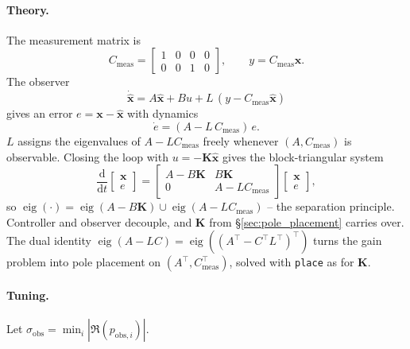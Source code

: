 \documentclass[11pt,a4paper]{article}
\begin{document}
\paragraph{Theory.}
The measurement matrix is
\begin{equation}
	C_{\mathrm{meas}} = \begin{bmatrix} 1 & 0 & 0 & 0 \\ 0 & 0 & 1 & 0 \end{bmatrix}, \qquad y = C_{\mathrm{meas}}\mathbf{x}.
\end{equation}
The observer
\begin{equation}
	\dot{\hat{\mathbf{x}}} = A\hat{\mathbf{x}} + B u + L\,(y - C_{\mathrm{meas}}\hat{\mathbf{x}})
	\label{eq:luenberger}
\end{equation}
gives an error $e = \mathbf{x} - \hat{\mathbf{x}}$ with dynamics
\begin{equation}
	\dot{e} = (A - L\,C_{\mathrm{meas}})\,e.
	\label{eq:err_dyn}
\end{equation}
$L$ assigns the eigenvalues of $A - LC_{\mathrm{meas}}$ freely whenever $(A, C_{\mathrm{meas}})$ is observable. Closing the loop with $u = -\mathbf{K}\hat{\mathbf{x}}$ gives the block-triangular system
\begin{equation}
	\frac{\mathrm{d}}{\mathrm{d}t}\!\begin{bmatrix} \mathbf{x} \\ e \end{bmatrix}
	= \begin{bmatrix} A - B\mathbf{K} & B\mathbf{K} \\ 0 & A - LC_{\mathrm{meas}} \end{bmatrix}\!\begin{bmatrix} \mathbf{x} \\ e \end{bmatrix},
	\label{eq:separation}
\end{equation}
so $\operatorname{eig}(\cdot) = \operatorname{eig}(A - B\mathbf{K}) \cup \operatorname{eig}(A - LC_{\mathrm{meas}})$ -- the separation principle. Controller and observer decouple, and $\mathbf{K}$ from \S\ref{sec:pole_placement} carries over. The dual identity $\operatorname{eig}(A - LC) = \operatorname{eig}((A^\top - C^\top L^\top)^\top)$ turns the gain problem into pole placement on $(A^\top, C_{\mathrm{meas}}^\top)$, solved with \texttt{place} as for $\mathbf{K}$.

\paragraph{Tuning.}
Let $\sigma_{\mathrm{obs}} = \min_i |\Re(p_{\mathrm{obs},i})|$.
\end{document}
